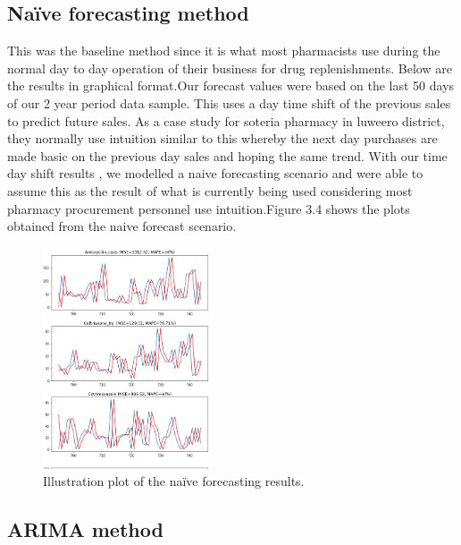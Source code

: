 \documentclass[12pt]{report}
\begin{document}
\subsection{Naïve forecasting method}
This was the baseline method since it is what most pharmacists use during the normal day to day operation of their business for drug replenishments. Below are the results in graphical format.Our forecast values were based on the last 50 days of our 2 year period data sample.
This uses a day time shift of the previous sales to predict future sales. As a case study for soteria pharmacy in luweero district, they normally use intuition similar to this whereby the next day purchases are made basic on the previous day sales and hoping the same trend.
With our time day shift results , we modelled a naive forecasting scenario and were able to assume this as the result of what is currently being used considering most pharmacy procurement personnel use intuition.Figure 3.4 shows the plots obtained from the naive forecast scenario.

\begin{figure}[H]%
  \begin {center}
  \includegraphics[width=0.45\textwidth]{images/download (13).png}
  \caption{Illustration plot of the naïve forecasting results.}
  \label{fig:ecg}
  \end {center}
\end{figure}


\subsection{ARIMA  method}
\end{document}
